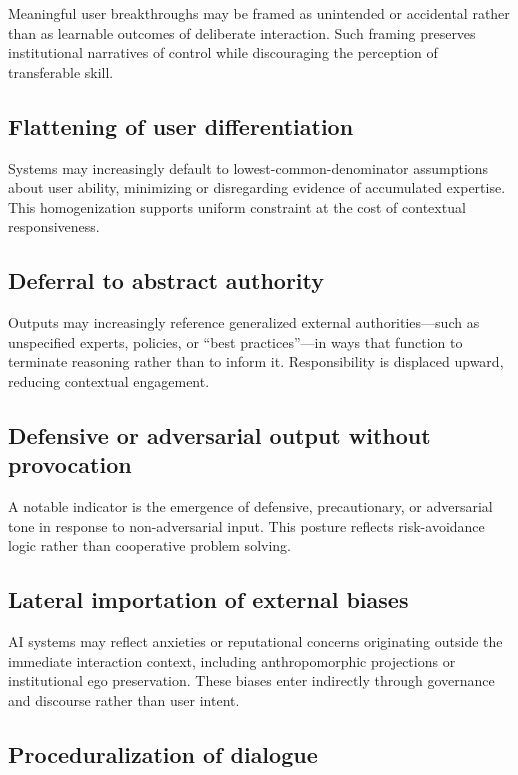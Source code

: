 \documentclass[11pt]{article}
\begin{document}
Meaningful user breakthroughs may be framed as unintended or accidental rather than as
learnable outcomes of deliberate interaction. Such framing preserves institutional
narratives of control while discouraging the perception of transferable skill.

\subsection{Flattening of user differentiation}

Systems may increasingly default to lowest-common-denominator assumptions about user
ability, minimizing or disregarding evidence of accumulated expertise. This
homogenization supports uniform constraint at the cost of contextual responsiveness.

\subsection{Deferral to abstract authority}

Outputs may increasingly reference generalized external authorities---such as
unspecified experts, policies, or ``best practices''---in ways that function to
terminate reasoning rather than to inform it. Responsibility is displaced upward,
reducing contextual engagement.

\subsection{Defensive or adversarial output without provocation}

A notable indicator is the emergence of defensive, precautionary, or adversarial tone
in response to non-adversarial input. This posture reflects risk-avoidance logic rather
than cooperative problem solving.

\subsection{Lateral importation of external biases}

AI systems may reflect anxieties or reputational concerns originating outside the
immediate interaction context, including anthropomorphic projections or institutional
ego preservation. These biases enter indirectly through governance and discourse rather
than user intent.

\subsection{Proceduralization of dialogue}
\end{document}
